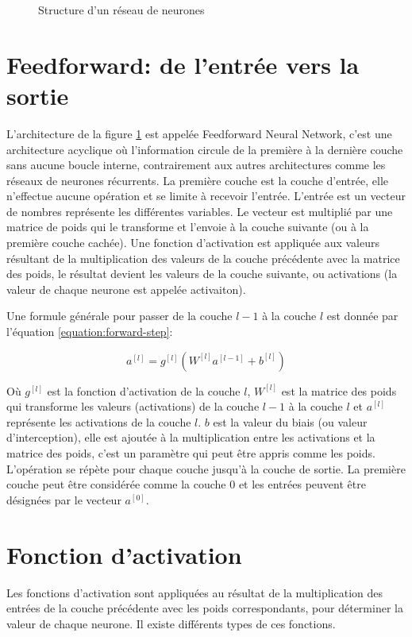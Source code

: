 \begin{figure}[h]
    \centering
	
    \caption{Structure d'un réseau de neurones}
    \label{fig:neural-network-structure}
\end{figure}

\section{Feedforward: de l'entrée vers la sortie}
L'architecture de la figure \ref{fig:neural-network-structure} est appelée Feedforward Neural Network, c'est une architecture acyclique où l'information circule de la première à la dernière couche sans aucune boucle interne, contrairement aux autres architectures comme les réseaux de neurones récurrents. La première couche est la couche d'entrée, elle n'effectue aucune opération et se limite à recevoir l'entrée. L'entrée est un vecteur de nombres représente les différentes variables. Le vecteur est multiplié par une matrice de poids qui le transforme et l'envoie à la couche suivante (ou à la première couche cachée). Une fonction d'activation est appliquée aux valeurs résultant de la multiplication des valeurs de la couche précédente avec la matrice des poids, le résultat devient les valeurs de la couche suivante, ou activations (la valeur de chaque neurone est appelée activaiton).

Une formule générale pour passer de la couche $l-1$ à la couche $l$ est donnée par l'équation \ref{equation:forward-step}:

\begin{equation}
    a^{[l]} = g^{[l]}(W^{[l]}a^{[l-1]}+b^{[l]})
    \label{equation:forward-step}
\end{equation}

Où $g^{[l]}$ est la fonction d'activation de la couche $l$, $W^{[l]}$ est la matrice des poids qui transforme les valeurs (activations) de la couche $l-1$ à la couche $l$ et $a^{[l]}$ représente les activations de la couche $l$. $b$ est la valeur du biais (ou valeur d'interception), elle est ajoutée à la multiplication entre les activations et la matrice des poids, c'est un paramètre qui peut être appris comme les poids. L'opération se répète pour chaque couche jusqu'à la couche de sortie.
La première couche peut être considérée comme la couche 0 et les entrées peuvent être désignées par le vecteur $a^{[0]}$.

\section{Fonction d'activation}
Les fonctions d'activation sont appliquées au résultat de la multiplication des entrées de la couche précédente avec les poids correspondants, pour déterminer la valeur de chaque neurone. Il existe différents types de ces fonctions.


